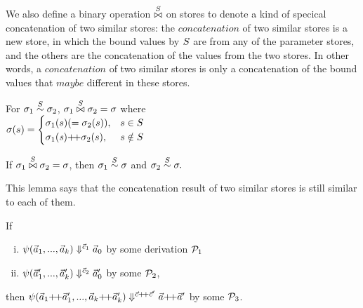 We also define a binary operation $\x\S$ on stores to denote a kind of specical concatenation of two similar stores: 
the $concatenation$ of two similar stores is a new store, in which the bound values by $\S$ are from any of the parameter stores, and 
the others are the concatenation of the values from the two stores. 
In other words, a $concatenation$ of two similar stores is only a concatenation of the bound values that $maybe$ different in these stores.
\begin{defi} \label{def-sgm-join}
	For $\sgm_1 \~\S \sgm_2$,
	$\sgm_1 \x{\S} \sgm_2 = \sgm$ where \\
	$\sgm(s) =
	\begin{cases}
	\sgm_1(s) (=\sgm_2(s)), & s \in \S\\
	\sgm_1(\s) {\++} \sgm_2(s), & s \notin \S \\
	\end{cases} $
\end{defi}

\begin{lem} \label{lem-join1}
	If $\sgm_1 \x{\S} \sgm_2 = \sgm$, 
	then $\sgm_1 \~{\S} \sgm$ and $\sgm_2 \~{\S} \sgm.$
\end{lem}
This lemma says that the concatenation result of two similar stores is still similar to each of them.


\begin{lem} \label{lem-psi-join}
	If \begin{enumerate}[(i)]
	 \item $\sevalfg{\lcall}{\a_{1},...,\a_{k}}{\c_1}{\a_0}$ by some derivation $\MP_1$
	 \item $\sevalfg{\lcall}{\a'_{1},...,\a'_{k}}{\c_2}{\a_0'}$ by some $\MP_2$,
	\end{enumerate}
	then $\sevalfg{\lcall}{\a_{1} {\++} \a'_{1},...,\a_{k} {\++} \a'_{k}}{\c {\++} \c'}{\a {\++} \a'}$ by some $\MP_3$.
\end{lem}

